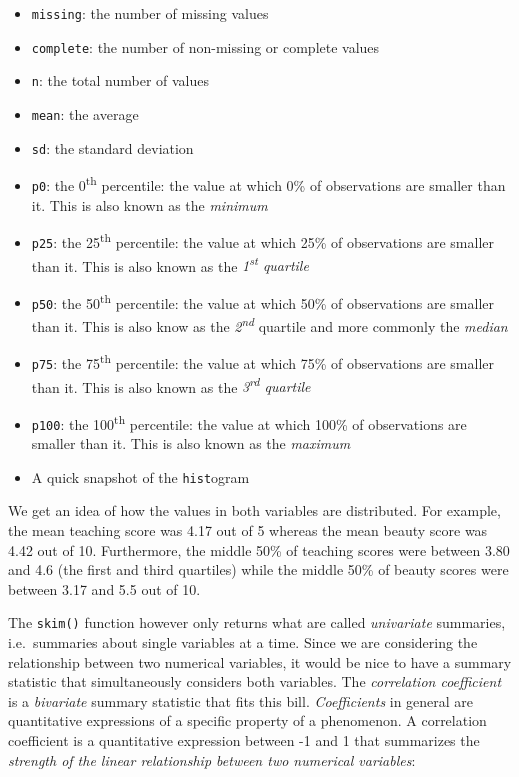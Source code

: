 \documentclass[12pt, krantz2,]{krantz}
\providecommand{\tightlist}{%
  \setlength{\itemsep}{0pt}\setlength{\parskip}{0pt}}
\begin{document}
\begin{itemize}
\tightlist
\item
  \texttt{missing}: the number of missing values
\item
  \texttt{complete}: the number of non-missing or complete values
\item
  \texttt{n}: the total number of values
\item
  \texttt{mean}: the average
\item
  \texttt{sd}: the standard deviation
\item
  \texttt{p0}: the 0\textsuperscript{th} percentile: the value at which 0\% of observations are smaller than it. This is also known as the \emph{minimum}
\item
  \texttt{p25}: the 25\textsuperscript{th} percentile: the value at which 25\% of observations are smaller than it. This is also known as the \emph{1\textsuperscript{st} quartile}
\item
  \texttt{p50}: the 50\textsuperscript{th} percentile: the value at which 50\% of observations are smaller than it. This is also know as the \emph{2\textsuperscript{nd}} quartile and more commonly the \emph{median}
\item
  \texttt{p75}: the 75\textsuperscript{th} percentile: the value at which 75\% of observations are smaller than it. This is also known as the \emph{3\textsuperscript{rd} quartile}
\item
  \texttt{p100}: the 100\textsuperscript{th} percentile: the value at which 100\% of observations are smaller than it. This is also known as the \emph{maximum}
\item
  A quick snapshot of the \texttt{hist}ogram
\end{itemize}

We get an idea of how the values in both variables are distributed. For example, the mean teaching score was 4.17 out of 5 whereas the mean beauty score was 4.42 out of 10. Furthermore, the middle 50\% of teaching scores were between 3.80 and 4.6 (the first and third quartiles) while the middle 50\% of beauty scores were between 3.17 and 5.5 out of 10.

The \texttt{skim()} function however only returns what are called \emph{univariate} summaries, i.e.~summaries about single variables at a time. Since we are considering the relationship between two numerical variables, it would be nice to have a summary statistic that simultaneously considers both variables. The \emph{correlation coefficient} is a \emph{bivariate} summary statistic that fits this bill. \emph{Coefficients} in general are quantitative expressions of a specific property of a phenomenon. A correlation coefficient is a quantitative expression between -1 and 1 that summarizes the \emph{strength of the linear relationship between two numerical variables}:
\end{document}
